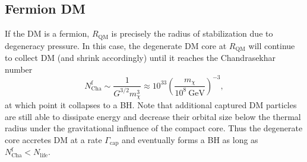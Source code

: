 \documentclass[preprintnumbers,amsmath,amssymb,prd,superscriptaddress]{revtex4}
\newcommand{\GeV}{\text{GeV}}
\def\r{\right)}
\def\l{\left(}
\begin{document}
\subsection{Fermion DM}
If the DM is a fermion, $R_\text{QM}$ is precisely the radius of stabilization due to degeneracy pressure.
In this case, the degenerate DM core at $R_\text{QM}$ will continue to collect DM (and shrink accordingly) until it reaches the Chandrasekhar number
\begin{equation}
N^\text{f}_\text{Cha} \sim \frac{1}{G^{3/2} m_\chi^3} \approx 10^{33} \l \frac{m_\chi}{10^{8} ~\GeV}\r^{-3},
\end{equation}
at which point it collapses to a BH. 
Note that additional captured DM particles are still able to dissipate energy and decrease their orbital size below the thermal radius under the gravitational influence of the compact core. 
Thus the degenerate core accretes DM at a rate $\Gamma_\text{cap}$ and eventually forms a BH as long as $N^\text{f}_\text{Cha} < N_\text{life}$. 
\end{document}
